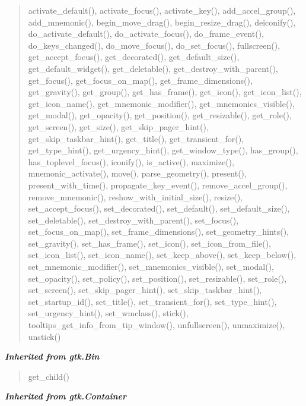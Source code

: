 \begin{quote}
activate\_default(), activate\_focus(), activate\_key(), add\_accel\_group(), add\_mnemonic(), begin\_move\_drag(), begin\_resize\_drag(), deiconify(), do\_activate\_default(), do\_activate\_focus(), do\_frame\_event(), do\_keys\_changed(), do\_move\_focus(), do\_set\_focus(), fullscreen(), get\_accept\_focus(), get\_decorated(), get\_default\_size(), get\_default\_widget(), get\_deletable(), get\_destroy\_with\_parent(), get\_focus(), get\_focus\_on\_map(), get\_frame\_dimensions(), get\_gravity(), get\_group(), get\_has\_frame(), get\_icon(), get\_icon\_list(), get\_icon\_name(), get\_mnemonic\_modifier(), get\_mnemonics\_visible(), get\_modal(), get\_opacity(), get\_position(), get\_resizable(), get\_role(), get\_screen(), get\_size(), get\_skip\_pager\_hint(), get\_skip\_taskbar\_hint(), get\_title(), get\_transient\_for(), get\_type\_hint(), get\_urgency\_hint(), get\_window\_type(), has\_group(), has\_toplevel\_focus(), iconify(), is\_active(), maximize(), mnemonic\_activate(), move(), parse\_geometry(), present(), present\_with\_time(), propagate\_key\_event(), remove\_accel\_group(), remove\_mnemonic(), reshow\_with\_initial\_size(), resize(), set\_accept\_focus(), set\_decorated(), set\_default(), set\_default\_size(), set\_deletable(), set\_destroy\_with\_parent(), set\_focus(), set\_focus\_on\_map(), set\_frame\_dimensions(), set\_geometry\_hints(), set\_gravity(), set\_has\_frame(), set\_icon(), set\_icon\_from\_file(), set\_icon\_list(), set\_icon\_name(), set\_keep\_above(), set\_keep\_below(), set\_mnemonic\_modifier(), set\_mnemonics\_visible(), set\_modal(), set\_opacity(), set\_policy(), set\_position(), set\_resizable(), set\_role(), set\_screen(), set\_skip\_pager\_hint(), set\_skip\_taskbar\_hint(), set\_startup\_id(), set\_title(), set\_transient\_for(), set\_type\_hint(), set\_urgency\_hint(), set\_wmclass(), stick(), tooltips\_get\_info\_from\_tip\_window(), unfullscreen(), unmaximize(), unstick()
\end{quote}

\large{\textbf{\textit{Inherited from gtk.Bin}}}

\begin{quote}
get\_child()
\end{quote}

\large{\textbf{\textit{Inherited from gtk.Container}}}

